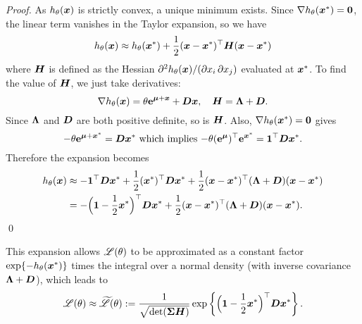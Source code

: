 \begin{proof}
As $h_\theta(\bm{x})$ is strictly convex, a unique minimum exists. Since $\nabla
h_\theta(\bm{x}^*) = \bm{0}$, the linear term vanishes in the Taylor expansion,
so we have
\[ h_\theta(\bm{x}) \approx h_\theta(\bm{x}^*)
  + \frac12 (\bm{x} - \bm{x}^*)^\top \bm{H} (\bm{x} - \bm{x}^*) \]
where $\bm{H}$ is defined as the Hessian $\partial^2 h_\theta(\bm{x}) / ( \partial
x_i \, \partial x_j )$ evaluated at $\bm{x}^*$.  To find the value of $\bm{H}$, we
just take derivatives:
\[ \nabla h_\theta(\bm{x}) = \theta \text{\bf{e}}^{\bm{\mu} + \bm{x}} + \bm{D} \bm{x},
  \quad \bm{H} = \bm{\Lambda} + \bm{D}. \]
Since $\bm{\Lambda}$ and $\bm{D}$ are both positive definite, so is $\bm{H}$. Also,
$\nabla h_\theta(\bm{x}^*) = \bm{0}$ gives
\begin{equation} \label{grad_zero_subs}
    {-}\theta \text{\bf{e}}^{\bm{\mu} + \bm{x}^*} = \bm{D} \bm{x}^* \text{ which implies }
  {-}\theta (\text{\bf{e}}^{\bm{\mu}})^\top \text{\bf{e}}^{\bm{x}^*} = \bm{1}^\top \bm{D} \bm{x}^*.
\end{equation}
Therefore the expansion becomes
\begin{align*}
	h_\theta(\bm{x}) &\approx -\bm{1}^\top \bm{D} \bm{x}^*
 + \frac12 (\bm{x}^*)^\top \bm{D} \bm{x}^*
 + \frac12 (\bm{x} - \bm{x}^*)^\top (\bm{\Lambda} + \bm{D}) (\bm{x} - \bm{x}^*) \\
	&= - \Bigl(\bm{1} - \frac12 \bm{x}^* \Bigr)^\top \bm{D} \bm{x}^*
 + \frac12 (\bm{x} - \bm{x}^*)^\top (\bm{\Lambda} + \bm{D}) (\bm{x} - \bm{x}^*).
\end{align*}
\qed
\end{proof}

This expansion allows $\mathscr{L}(\theta)$ to be approximated as a constant
factor $\exp\{-h_\theta(\bm{x}^*)\}$ times the integral over a normal density
(with inverse covariance $\bm{\Lambda} + \bm{D}$), which leads to
\[
	\mathscr{L}(\theta) \approx \widetilde{\mathscr{L}}(\theta)
 := \frac{1}{\sqrt{\det(\bm{\Sigma} \bm{H})}}
  \exp\left\{ \Bigl(\bm{1} - \frac12 \bm{x}^* \Bigr)^\top \bm{D} \bm{x}^* \right\}.
\]

